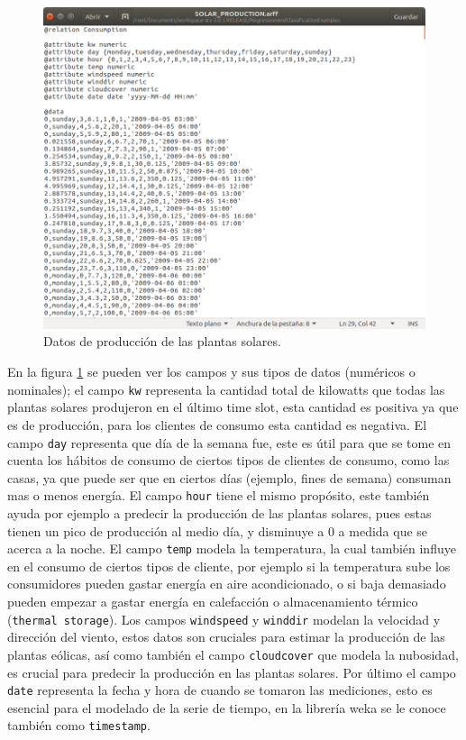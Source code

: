 \begin{figure}[!t]
	\centering
	\includegraphics[width=15cm]{img/datos.png}
	\caption{Datos de producción de las plantas solares. }
	\label{fig:datos}
\end{figure}	

En la figura \ref{fig:datos} se pueden ver los campos y sus tipos de datos (numéricos o nominales); el campo \texttt{kw} representa la cantidad total de kilowatts que todas las plantas solares produjeron en el último time slot, esta cantidad es positiva ya que es de producción, para los clientes de consumo esta cantidad es negativa. El campo \texttt{day} representa que día de la semana fue, este es útil para que se tome en cuenta los hábitos de consumo de ciertos tipos de clientes de consumo, como las casas, ya que puede ser que en ciertos días (ejemplo, fines de semana) consuman mas o menos energía. El campo \texttt{hour} tiene el mismo propósito, este también ayuda por ejemplo a predecir la producción de las plantas solares, pues estas tienen un pico de producción al medio día, y disminuye a 0 a medida que se acerca a la noche. El campo \texttt{temp} modela la temperatura, la cual también influye en el consumo de ciertos tipos de cliente, por ejemplo si la temperatura sube los consumidores pueden gastar energía en aire acondicionado, o si baja demasiado pueden empezar a gastar energía en calefacción o almacenamiento térmico (\texttt{thermal storage}). 
Los campos \texttt{windspeed} y \texttt{winddir} modelan la velocidad y dirección del viento, estos datos son cruciales para estimar la producción de las plantas eólicas, así como también el campo \texttt{cloudcover} que modela la nubosidad, es crucial para predecir la producción en las plantas solares. 
Por último el campo \texttt{date} representa la fecha y hora de cuando se tomaron las mediciones, esto es esencial para el modelado de la serie de tiempo, en la librería weka se le conoce también como \texttt{timestamp}.

